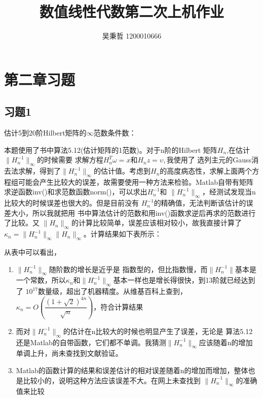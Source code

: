 \documentclass{ctexart}
\author{吴秉哲 1200010666}
\title{数值线性代数第二次上机作业}
\begin{document}
\maketitle
\section*{第二章习题}
\subsection*{习题1}
估计5到20阶Hilbert矩阵的$\infty$范数条件数：


本题使用了书中算法5.12(估计矩阵的1范数)。对于n阶的Hilbert
矩阵$H_n$,在估计$\lVert H^{-1}_{n} \lVert_{\infty}$的时候需要
求解方程$H^{T}_{n}\omega=x 和 H_nz=\upsilon,$我使用了
选列主元的Gauss消去法求解，得到了$\lVert H^{-1}_{n}
\lVert_{\infty}$的估计值。考虑到$H_n$的高度病态性，求解上面两个方程组可能会产生比较大的误差，故需要使用一种方法来检验。Matlab自带有矩阵
求逆函数inv()和求范数函数norm()，可以求出$H^{-1}_{n}$和
$\lVert H^{-1}_{n} \lVert_{\infty}$，经测试发现当n比较大的时候误差也很大的。但是目前没有
$H^{-1}_{n}$的精确值，无法判断该估计的误差大小，所以我就把用
书中算法估计的范数和用inv()函数求逆后再求的范数进行了比较。又
$\lVert H_{n} \lVert_{\infty}$的计算比较简单，误差应该相对较小，故我直接计算了$\kappa
_n=\lVert H^{-1}_{n} \lVert_{\infty}$$\lVert H_{n} \lVert_{\infty}$。计算结果如下表所示：





从表中可以看出，
\begin{enumerate}
\item
$\lVert H^{-1}_{n} \lVert_{\infty}$随阶数的增长是近乎是
指数型的，但比指数慢，而$\lVert H^{-1}_{n} \lVert$基本是
一个常数，所以$\kappa_n 和\lVert H^{-1}_{n} \lVert_{\infty}$基本一样也是增长得很快，到13阶就已经达到了
$10^17$数量级，超出了机器精度。从维基百科上查到，$\kappa_n=
O(\dfrac{(1+\sqrt{2})^{4n}}{\sqrt{n}})$，符合计算结果
\item
而对$\lVert H^{-1}_{n} \lVert_{\infty}$的估计在n比较大的时候也明显产生了误差，无论是
算法5.12还是Matlab的自带函数，它们都不单调。我猜测$\lVert H^{-1}_{n} \lVert_{\infty}$应该随着n的增加单调上升，尚未查找到文献验证。
\item
Matlab的函数计算的结果和误差估计的相对误差随着n的增加而增加，整体也是比较小的，说明这种方法应该误差不大。在网上未查找到
$\lVert H^{-1}_{n} \lVert_{\infty}$的准确值来比较
\end{enumerate}
\end{document}
